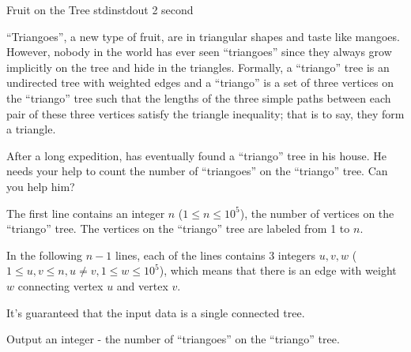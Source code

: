 
\begin{problem}{Fruit on the Tree}
{stdin}{stdout}
{2 second}{}{}

``Triangoes'', a new type of fruit, are in triangular shapes and taste like mangoes. However, nobody in the world has ever seen ``triangoes'' since they always grow implicitly on the tree and hide in the triangles. Formally, a ``triango'' tree is an undirected tree with weighted edges and a ``triango'' is a set of three vertices on the ``triango'' tree such that the lengths of the three simple paths between each pair of these three vertices satisfy the triangle inequality; that is to say, they form a triangle.

After a long expedition, \Suzukaze has eventually found a ``triango'' tree in his house. He needs your help to count the number of ``triangoes'' on the ``triango'' tree. Can you help him?

\InputFile

The first line contains an integer $n$ ($1 \le n \le 10^5$), the number of vertices on the ``triango'' tree. The vertices on the ``triango'' tree are labeled from 1 to $n$.

In the following $n-1$ lines, each of the lines contains 3 integers $u, v, w$ ($1 \le u,v \le n, u \neq v, 1 \le w \le 10^5$), which means that there is an edge with weight $w$ connecting vertex $u$ and vertex $v$.

It's guaranteed that the input data is a single connected tree.

\OutputFile

Output an integer - the number of ``triangoes'' on the ``triango'' tree.

\Examples

\begin{example}
%
\end{example}

\end{problem}
